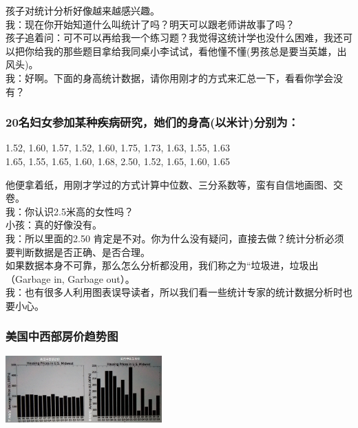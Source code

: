 孩子对统计分析好像越来越感兴趣。\\
我：现在你开始知道什么叫统计了吗？明天可以跟老师讲故事了吗？\\
孩子追着问：可不可以再给我一个练习题？我觉得这统计学也没什么困难，我还可以把你给我的那些题目拿给我同桌小李试试，看他懂不懂(男孩总是要当英雄，出风头)。\\
我：好啊。下面的身高统计数据，请你用刚才的方式来汇总一下，看看你学会没有？\\

\hypertarget{ux540dux5987ux5973ux53c2ux52a0ux67d0ux79cdux75beux75c5ux7814ux7a76ux5979ux4eecux7684ux8eabux9ad8ux4ee5ux7c73ux8ba1ux5206ux522bux4e3a}{%
\subsubsection{20名妇女参加某种疾病研究，她们的身高(以米计)分别为：}\label{ux540dux5987ux5973ux53c2ux52a0ux67d0ux79cdux75beux75c5ux7814ux7a76ux5979ux4eecux7684ux8eabux9ad8ux4ee5ux7c73ux8ba1ux5206ux522bux4e3a}}

1.52, 1.60, 1.57, 1.52, 1.60, 1.75, 1.73, 1.63, 1.55, 1.63\\
1.65, 1.55, 1.65, 1.60, 1.68, 2.50, 1.52, 1.65, 1.60, 1.65

他便拿着纸，用刚才学过的方式计算中位数、三分系数等，蛮有自信地画图、交卷。\\
我：你认识2.5米高的女性吗？\\
小孩：真的好像没有。\\
我：所以里面的2.50
肯定是不对。你为什么没有疑问，直接去做？统计分析必须要判断数据是否正确、是否合理。\\
如果数据本身不可靠，那么怎么分析都没用，我们称之为``垃圾进，垃圾出（Garbage
in, Garbage out）。\\
我：也有很多人利用图表误导读者，所以我们看一些统计专家的统计数据分析时也要小心。\\

\hypertarget{ux7f8eux56fdux4e2dux897fux90e8ux623fux4ef7ux8d8bux52bfux56fe}{%
\subsubsection{美国中西部房价趋势图}\label{ux7f8eux56fdux4e2dux897fux90e8ux623fux4ef7ux8d8bux52bfux56fe}}


\includegraphics[width=6cm]{Stat_f22-1_12.jpg}

